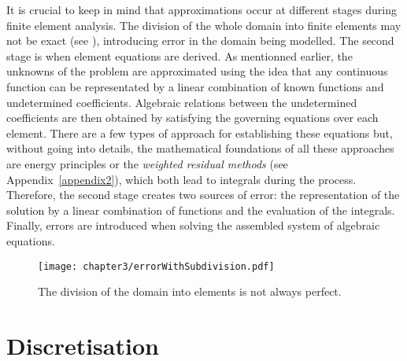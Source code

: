 It is crucial to keep in mind that approximations occur at different stages during finite element analysis. The division of the whole domain into finite elements may not be exact (see ), introducing error in the domain being modelled. The second stage is when element equations are derived. As mentionned earlier, the unknowns of the problem are approximated using the idea that any continuous function can be representated by a linear combination of known functions and undetermined coefficients. Algebraic relations between the undetermined coefficients are then obtained by satisfying the governing equations over each element. There are a few types of approach for establishing these equations but, without going into details, the mathematical foundations of all these approaches are energy principles or the \emph{weighted residual methods} (see Appendix~\ref{appendix2}), which both lead to integrals during the process. Therefore, the second stage creates two sources of error: the representation of the solution by a linear combination of functions and the evaluation of the integrals. Finally, errors are introduced when solving the assembled system of algebraic equations. 
%
\begin{figure}[h]
\begin{center}
\texttt{[image: chapter3/errorWithSubdivision.pdf]}
\end{center}
\caption[Error introduced by the division into elements]{The division of the domain into elements is not always perfect.}
\label{chap3:fig-errorWithSubdivision}
\end{figure}

\section{Discretisation}

